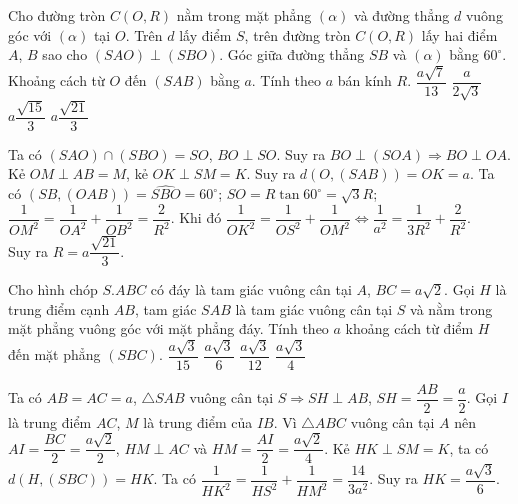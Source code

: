 \begin{ex}%
 Cho đường tròn $C(O,R)$ nằm trong mặt phẳng $(\alpha)$ và đường thẳng $d$ vuông góc với $(\alpha)$ tại $O$. Trên $d$ lấy điểm $S$, trên đường tròn $C(O,R)$ lấy hai điểm $A$, $B$ sao cho $(SAO)\perp (SBO)$. Góc giữa đường thẳng $SB$ và $(\alpha)$ bằng $60^\circ$. Khoảng cách từ $O$ đến $(SAB)$ bằng $a$. Tính theo $a$ bán kính $R$.
\choice
{$\dfrac{a\sqrt{7}}{13}$}
{$\dfrac{a}{2\sqrt{3}}$}
{$a\dfrac{\sqrt{15}}{3}$}
{\True $a\dfrac{\sqrt{21}}{3}$}
\loigiai
{
\immini
{Ta có $(SAO)\cap (SBO)=SO$, $BO\perp SO$. Suy ra $BO\perp (SOA)\Rightarrow BO\perp OA$. Kẻ $OM\perp AB=M$, kẻ $OK\perp SM=K$.
Suy ra $d(O, (SAB))=OK=a$. Ta có $(SB, (OAB))=\widehat{SBO}=60^\circ$; $SO=R\tan 60^\circ=\sqrt{3}R$;\\ $\dfrac{1}{OM^2}=\dfrac{1}{OA^2}+\dfrac{1}{OB^2}=\dfrac{2}{R^2}$.
Khi đó $\dfrac{1}{OK^2}=\dfrac{1}{OS^2}+\dfrac{1}{OM^2}\Leftrightarrow \dfrac{1}{a^2}=\dfrac{1}{3R^2}+\dfrac{2}{R^2}$.\\ 
Suy ra $R=a\dfrac{\sqrt{21}}{3}$.
}
{
}
}
\end{ex}


\begin{ex}%
 Cho hình chóp $S.ABC$ có đáy là tam giác vuông cân tại $A$, $BC=a\sqrt{2}$. Gọi $H$ là trung điểm cạnh $AB$, tam giác $SAB$ là tam giác vuông cân tại $S$ và nằm trong mặt phẳng vuông góc với mặt phẳng đáy. Tính theo $a$ khoảng cách từ điểm $H$ đến mặt phẳng $(SBC)$.
\choice
{$\dfrac{a\sqrt{3}}{15}$}
{\True $\dfrac{a\sqrt{3}}{6}$}
{$\dfrac{a\sqrt{3}}{12}$}
{$\dfrac{a\sqrt{3}}{4}$}
\loigiai
{
\immini
{Ta có $AB=AC=a$, $\triangle SAB$ vuông cân tại $S\Rightarrow SH\perp AB$, $SH=\dfrac{AB}{2}=\dfrac{a}{2}$. Gọi $I$ là trung điểm $AC$, $M$ là trung điểm của $IB$. Vì $\triangle ABC$ vuông cân tại $A$ nên $AI=\dfrac{BC}{2}=\dfrac{a\sqrt{2}}{2}$, $HM\perp AC$ và $HM=\dfrac{AI}{2}=\dfrac{a\sqrt{2}}{4}$. Kẻ $HK\perp SM=K$, ta có $d(H, (SBC))=HK$. Ta có $\dfrac{1}{HK^2}=\dfrac{1}{HS^2}+\dfrac{1}{HM^2}=\dfrac{14}{3a^2}$. Suy ra $HK=\dfrac{a\sqrt{3}}{6}$.
}
{
}
}
\end{ex}

